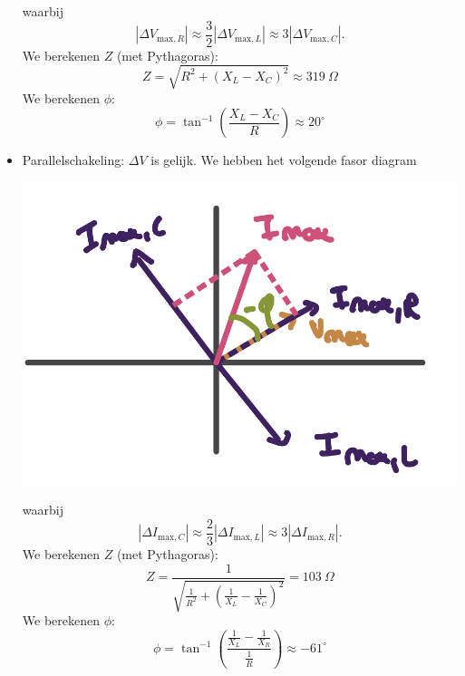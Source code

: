 \begin{description}[labelwidth=1.5cm, leftmargin=!]
\begin{itemize}
\begin{center}
                \end{center}
                waarbij 
                \begin{equation*}
                    |\Delta V_{\text{max},R}| \approx \frac{3}{2}|\Delta V_{\text{max},L}| \approx 3|\Delta V_{\text{max},C}|.
                \end{equation*}
                We berekenen $Z$ (met Pythagoras):
                \begin{equation*}
                    Z = \sqrt{R^2 + (X_L - X_C)^2} \approx 319 \ \Omega
                \end{equation*}
                We berekenen $\phi$:
                \begin{equation*}
                    \phi = \tan^{-1}\left(\frac{X_L - X_C}{R}\right) \approx 20^\circ
                \end{equation*}
  
            \item Parallelschakeling: $\Delta V$ is gelijk. We hebben het volgende fasor diagram
                \begin{center}
                    \includegraphics[scale=0.3]{oz09/resources/Oz9Oef1-parallel.png}
                \end{center}
                waarbij
                \begin{equation*}
                    |\Delta I_{\text{max},C}| \approx \frac{2}{3}|\Delta I_{\text{max},L}| \approx 3|\Delta I_{\text{max},R}|.
                \end{equation*}
                We berekenen $Z$ (met Pythagoras):
                \begin{equation*}
                    Z = \frac{1}{\sqrt{\frac{1}{R^2} + \left(\frac{1}{X_L} - \frac{1}{X_C}\right)^2}} = 103 \ \Omega
                \end{equation*}
                We berekenen $\phi$:
                \begin{equation*}
                    \phi = \tan^{-1}\left(\frac{\frac{1}{X_L} - \frac{1}{X_R}}{\frac{1}{R}}\right) \approx -61^\circ
                \end{equation*}
        \end{itemize}
\end{description}

\vspace{1cm}